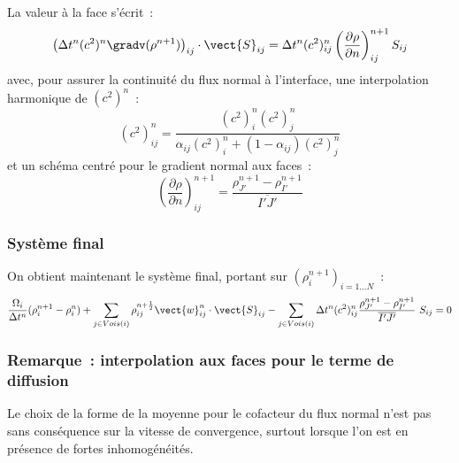 La valeur à la face s'écrit~:
\begin{equation}
\left(\Delta t^n (c^2)^n \gradv(\rho^{n+1})\right)_{ij}\cdot \vect{S}_{ij}
= \Delta t^n (c^2)^n_{ij}
\displaystyle \left( \frac{\partial \rho}{\partial n} \right)^{n+1}_{ij}S_{ij}
\end{equation}
avec, pour assurer la continuité du flux normal à l'interface,
une interpolation harmonique de $(c^2)^n$~:
\begin{equation}\label{Cfbl_Cfmsvl_eq_harmonique_cfmsvl}
\displaystyle(c^2)_{ij}^n
= \frac{(c^2)_{i}^n (c^2)_{j}^n}
{\alpha_{ij}(c^2)_{i}^n+(1-\alpha_{ij})(c^2)_{j}^n}
\end{equation}
et un schéma centré pour le gradient normal aux faces~:
\begin{equation}
\displaystyle \left( \frac{\partial \rho}{\partial n} \right)^{n+1}_{ij}
= \displaystyle\frac{\rho_{J'}^{n+1}-\rho_{I'}^{n+1}}{\overline{I'J'}}
\end{equation}

\subsubsection*{Système final}

On obtient maintenant le système final, portant sur
$(\rho_i^{n+1})_{i=1 \ldots N}$~:
\begin{equation}\label{Cfbl_Cfmsvl_eq_densite_finale_cfmsvl}
\displaystyle\frac{\Omega_i}{\Delta t^n} (\rho_i^{n+1}-\rho_i^n)
+\sum\limits_{j\in Vois(i)}\rho_{ij}^{n+\frac{1}{2}}
\vect{w}_{ij}^n \cdot \vect{S}_{ij}
-\sum\limits_{j\in Vois(i)} \Delta t^n (c^2)_{ij}^n
\displaystyle\frac{\rho_{J'}^{n+1}-\rho_{I'}^{n+1}}{\overline{I'J'}}\ S_{ij}
= 0
\end{equation}



\subsubsection*{Remarque~: interpolation aux faces pour le terme de diffusion}

Le choix de la forme de la moyenne pour le cofacteur du flux
normal n'est pas sans conséquence sur la vitesse de convergence, surtout
lorsque l'on est en présence de fortes inhomogénéités.

